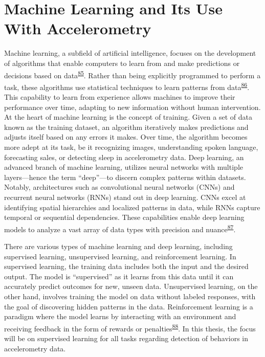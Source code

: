 \documentclass[
  10pt,
]{scrbook}
\begin{document}
\hypertarget{machine-learning-and-its-use-with-accelerometry}{%
\section{Machine Learning and Its Use With
Accelerometry}\label{machine-learning-and-its-use-with-accelerometry}}

Machine learning, a subfield of artificial intelligence, focuses on the
development of algorithms that enable computers to learn from and make
predictions or decisions based on
data\textsuperscript{\protect\hyperlink{ref-hastie01statisticallearning}{85}}.
Rather than being explicitly programmed to perform a task, these
algorithms use statistical techniques to learn patterns from
data\textsuperscript{\protect\hyperlink{ref-bishop_2006}{86}}. This
capability to learn from experience allows machines to improve their
performance over time, adapting to new information without human
intervention. At the heart of machine learning is the concept of
training. Given a set of data known as the training dataset, an
algorithm iteratively makes predictions and adjusts itself based on any
errors it makes. Over time, the algorithm becomes more adept at its
task, be it recognizing images, understanding spoken language,
forecasting sales, or detecting sleep in accelerometry data. Deep
learning, an advanced branch of machine learning, utilizes neural
networks with multiple layers---hence the term ``deep''---to discern
complex patterns within datasets. Notably, architectures such as
convolutional neural networks (CNNs) and recurrent neural networks
(RNNs) stand out in deep learning. CNNs excel at identifying spatial
hierarchies and localized patterns in data, while RNNs capture temporal
or sequential dependencies. These capabilities enable deep learning
models to analyze a vast array of data types with precision and
nuance\textsuperscript{\protect\hyperlink{ref-Goodfellow-et-al-2016}{87}}.

There are various types of machine learning and deep learning, including
supervised learning, unsupervised learning, and reinforcement learning.
In supervised learning, the training data includes both the input and
the desired output. The model is ``supervised'' as it learns from this
data until it can accurately predict outcomes for new, unseen data.
Unsupervised learning, on the other hand, involves training the model on
data without labeled responses, with the goal of discovering hidden
patterns in the data. Reinforcement learning is a paradigm where the
model learns by interacting with an environment and receiving feedback
in the form of rewards or
penalties\textsuperscript{\protect\hyperlink{ref-sutton_1998}{88}}. In
this thesis, the focus will be on supervised learning for all tasks
regarding detection of behaviors in accelerometry data.
\end{document}
